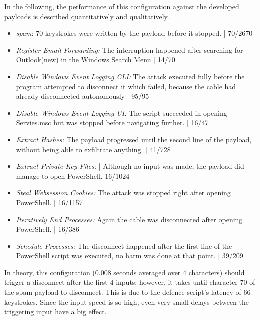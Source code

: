 In the following, the performance of this configuration against the developed payloads is described quantitatively and qualitatively.

\begin{itemize}
    \item  \emph{spam}: 70 keystrokes were written by the payload before it stopped. | 70/2670
    \item  \emph{Register Email Forwarding:} The interruption happened after searching for Outlook(new) in the Windows Search Menu  | 14/70 
    \item  \emph{Disable Windows Event Logging CLI:}  The attack executed fully before the program attempted to disconnect it which failed, because the cable had already disconnected autonomously | 95/95
    \item  \emph{Disable Windows Event Logging UI:} The script succeeded in opening Servies.msc but was stopped before navigating further. | 16/47
    \item  \emph{Extract Hashes:}  The payload progressed until the second line of the payload, without being able to exfiltrate anything. | 41/728 
    \item  \emph{Extract Private Key Files:}  | Although no input was made, the payload did manage to open PowerShell. 16/1024
    \item  \emph{Steal Websession Cookies:} The attack was stopped right after opening PowerShell. | 16/1157
    \item  \emph{Iteratively End Processes:} Again the cable was disconnected after opening PowerShell. | 16/386
    \item  \emph{Schedule Processes:} The disconnect happened after the first line of the PowerShell script was executed, no harm was done at that point. | 39/209
\end{itemize}

In theory, this configuration (0.008 seconds averaged over 4 characters) should trigger a disconnect after the first 4 inputs; however, it takes until character 70 of the spam payload to disconnect. This is due to the defence script's latency of 66 keystrokes. Since the input speed is so high, even very small delays between the triggering input have a big effect.


